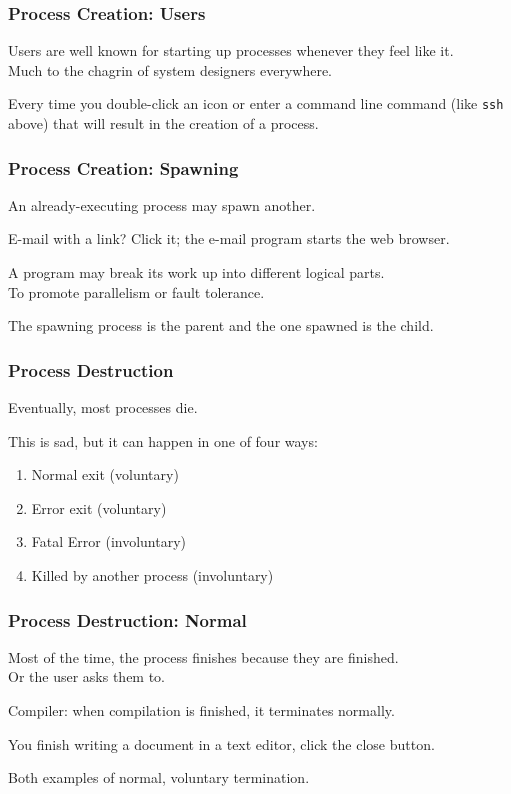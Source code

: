 \begin{frame}
\frametitle{Process Creation: Users}

Users are well known for starting up processes whenever they feel like it.\\
\quad Much to the chagrin of system designers everywhere. 

Every time you double-click an icon or enter a command line command (like \texttt{ssh} above) that will result in the creation of a process. 


\end{frame}

\begin{frame}
\frametitle{Process Creation: Spawning}

An already-executing process may spawn another. 

E-mail with a link? Click it; the e-mail program starts the web browser.

A program may break its work up into different logical parts.\\
\quad To promote parallelism or fault tolerance. 

The spawning process is the \alert{parent} and the one spawned is the \alert{child}. 


\end{frame}

\begin{frame}
\frametitle{Process Destruction}

Eventually, most processes die. 

This is sad, but it can happen in one of four ways:
\begin{enumerate}
	\item Normal exit (voluntary) 
	\item Error exit (voluntary)
	\item Fatal Error (involuntary)
	\item Killed by another process (involuntary)
\end{enumerate}


\end{frame}

\begin{frame}
\frametitle{Process Destruction: Normal}

Most of the time, the process finishes because they are finished.\\
\quad Or the user asks them to. 

Compiler: when compilation is finished, it terminates normally. 

You finish writing a document in a text editor, click the close button.

Both examples of normal, voluntary termination.

\end{frame}

